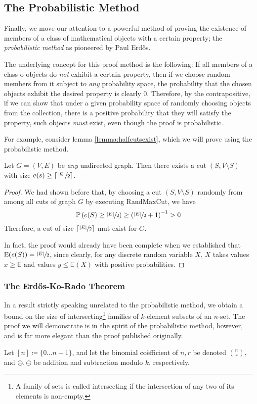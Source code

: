 	\subsection{The Probabilistic Method}
		Finally, we move our attention to a powerful method of proving the existence of members of a class of mathematical 
		objects with a certain property; the \emph{probabilistic method} as pioneered by Paul Erd\H{o}s. \par 
		The underlying concept
		for this proof method is the following: If all members of a class o objects do \emph{not} exhibit a certain property,
		then if we choose random members from it subject to \emph{any} probability space, the probability that the chosen
		objects exhibit the desired property is clearly 0. Therefore, by the contrapositive, if we can show that under a given 
		probability space of randomly choosing objects from the collection, there is a positive probability that they will 
		satisfy the property, such objects \emph{must} exist, even though the proof is probabilistic. \par
		For example, consider lemma \ref{lemma:halfcutsexist}, which we will prove using the probabilistic method.
		\begin{lemma}
			\label{lemma:halfcutsexist}
			Let $G = (V, E)$ be \emph{any} undirected graph. Then there exists a cut $(S, V\setminus S)$ with size 
			$e(s) \geq \left\lceil\sfrac{|E|}{2}\right\rceil$.
		\end{lemma}
		\begin{proof}
			We had shown before that, by choosing a cut $(S, V\setminus S)$ randomly from among all cuts of graph $G$ 
			by executing RandMaxCut, we have 
			$$
				\mathbb{P}\left(e(S) \geq \sfrac{|E|}{2}\right) \geq \left(\sfrac{|E|}{2} + 1\right)^{-1} > 0
			$$
			Therefore, a cut of size $\left\lceil\sfrac{|E|}{2}\right\rceil$ mut exist for $G$.\par
			In fact, the proof would already have been complete when we established that $\mathbb{E}(e(S)) = 
			\sfrac{|E|}{2}$, since clearly, for any discrete random variable $X$, $X$ takes values $x \geq \mathbb{E}$
			and values $y \leq \mathbb{E}(X)$ with positive probabilities.
		\end{proof}

		\subsubsection*{The Erd\H{o}s-Ko-Rado Theorem}
			In a result strictly speaking unrelated to the probabilistic method, we obtain a bound on the size of 
			intersecting\footnote{A family of sets is called intersecting if the intersection of any two of its elements 
			is non-empty.} families of $k$-element subsets of an $n$-set. The proof we will demonstrate is in the spirit
			of the probabilistic method, however, and is far more elegant than the proof published originally.\par 
			Let $[n] \coloneqq \{0 \hdots n-1\}$, and let
			the binomial co\"efficient of $n, r$ be denoted $\binom{n}{r}$, and $\oplus, \ominus$ be addition and 
			subtraction modulo $k$, respectively. 

